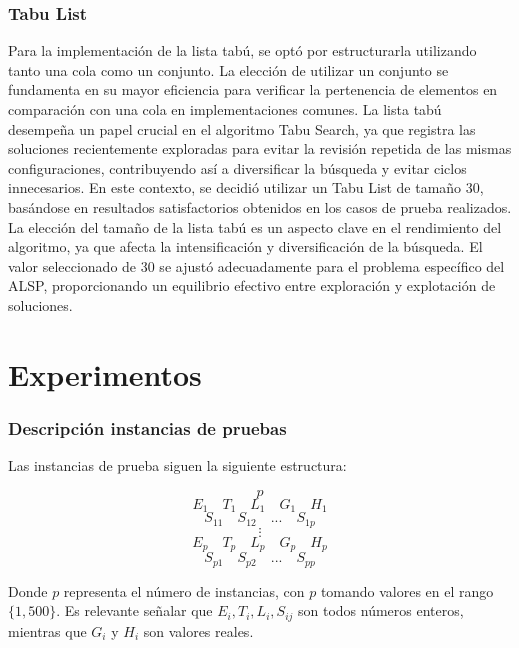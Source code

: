 \documentclass[letter, 10pt]{article}
\begin{document}
\subsubsection{Tabu List}
Para la implementaci\'on de la lista tab\'u, se opt\'o por estructurarla utilizando tanto una cola como un conjunto. La elecci\'on de utilizar un conjunto se fundamenta en su mayor eficiencia para verificar la pertenencia de elementos en comparaci\'on con una cola en implementaciones comunes. La lista tab\'u desempe\~{n}a un papel crucial en el algoritmo Tabu Search, ya que registra las soluciones recientemente exploradas para evitar la revisi\'on repetida de las mismas configuraciones, contribuyendo as\'i a diversificar la b\'usqueda y evitar ciclos innecesarios. En este contexto, se decidi\'o utilizar un Tabu List de tama\~{n}o 30, bas\'andose en resultados satisfactorios obtenidos en los casos de prueba realizados. La elecci\'on del tama\~{n}o de la lista tab\'u es un aspecto clave en el rendimiento del algoritmo, ya que afecta la intensificaci\'on y diversificaci\'on de la b\'usqueda. El valor seleccionado de 30 se ajust\'o adecuadamente para el problema espec\'ifico del ALSP, proporcionando un equilibrio efectivo entre exploraci\'on y explotaci\'on de soluciones.

\section{Experimentos}
\begin{comment}
    Se necesita saber c\'omo experimentaron, c\'omo definieron par\'ametros, 
c\'omo los fueron modificando, cu\'ales problemas/instancias se estudiaron y por qu\'e, etc. 
Recuerde que las t\'ecnicas completas son deterministas y las t\'ecnicas incompletas son estoc\'asticas.
\end{comment}
\subsubsection{Descripci\'on instancias de pruebas}
Las instancias de prueba siguen la siguiente estructura:

\[ p \]
\[ E_1 \quad T_1 \quad L_1 \quad G_1 \quad H_1 \]
\[ S_{11} \quad S_{12} \quad ... \quad S_{1p} \]
\[ \vdots \]
\[ E_p \quad T_p \quad L_p \quad G_p \quad H_p \]
\[ S_{p1} \quad S_{p2} \quad ... \quad S_{pp} \]

Donde \( p \) representa el n\'umero de instancias, con \( p \) tomando valores en el rango \(\{1, 500\}\). Es relevante se\~{n}alar que \( E_i, T_i, L_i, S_{ij} \) son todos n\'umeros enteros, mientras que \( G_i \) y \( H_i \) son valores reales.
\end{document}
